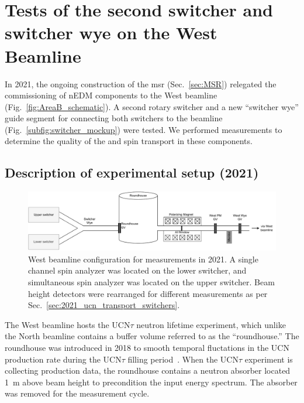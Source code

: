 
\chapter{Tests of the second switcher and switcher wye on the West Beamline}\label{chap:fall2021}


In 2021, the ongoing construction of the \acrshort{msr} (Sec.~\ref{sec:MSR}) relegated the commissioning of nEDM components to the West beamline (Fig.~\ref{fig:AreaB_schematic}). A second rotary switcher and a new ``switcher wye'' guide segment for connecting both switchers to the beamline (Fig.~\ref{subfig:switcher_mockup}) were tested. We performed measurements to determine the quality of the \ucn and \ucn spin transport in these components.


\section{Description of experimental setup (2021)}


\begin{figure}[h]
    \centering
    \includegraphics[width=\textwidth]{figures/westbeamline_2021.pdf}
    \caption[West beamline configuration for measurements in 2021.]
    {West beamline configuration for measurements in 2021. A single channel spin analyzer was located on the lower switcher, and simultaneous spin analyzer was located on the upper switcher. Beam height detectors were rearranged for different measurements as per Sec.~\ref{sec:2021_ucn_transport_switchers}.}\label{fig:west_beamline_2021}
\end{figure}

The West beamline hosts the UCN$\tau$ neutron lifetime experiment, which unlike the North beamline contains a buffer volume referred to as the ``roundhouse.'' The roundhouse was introduced in 2018 to smooth temporal fluctations in the UCN production rate during the UCN$\tau$ filling period~\cite{gonzalez_ucn_tau}. When the UCN$\tau$ experiment is collecting production data, the roundhouse contains a neutron absorber located \qty{1}{m} above beam height to precondition the input \ucn energy spectrum. The absorber was removed for the measurement cycle. 

